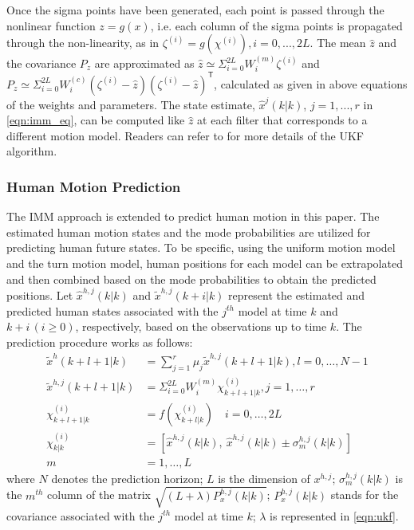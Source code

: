 \documentclass[letterpaper, 10 pt, conference]{ieeeconf}
\newcommand{\todoQ}[1]{\vspace{0px} %
	\todo[inline, color=orange!50]{\textbf{[Note:]} {#1}} %
}
\begin{document}
	Once the sigma points have been generated, each point is passed through the nonlinear function $z=g(x)$, i.e. each column of the sigma points is propagated through the non-linearity, as in $\zeta^{(i)}=g(\chi^{(i)}), i=0,...,2L$. The mean $\hat{z}$ and the covariance $P_z$ are approximated as $\hat{z}\simeq \Sigma_{i=0}^{2L}W_i^{(m)} \zeta^{(i)}$ and $P_z \simeq  \Sigma_{i=0}^{2L}W_i^{(c)}(\zeta^{(i)}-\hat{z})(\zeta^{(i)}-\hat{z})^\mathsf{T}$, calculated as given in above equations of the weights and parameters\cite{hong2013vehicle}. The state estimate, $\hat{x}^j(k|k)$, $j=1,...,r$ in \cref{eqn:imm_eq}, can be computed like $\hat{z}$ at each filter that corresponds to a different motion model. 
	Readers can refer to \cite {haykin2004kalman} for more details of the UKF algorithm.
	
	\subsubsection{Human Motion Prediction}\label{subsec:motion_pred}
	The IMM approach is extended to predict human motion in this paper. The estimated human motion states and the mode probabilities are utilized for predicting human future states.
	To be specific, using the uniform motion model and the turn motion model, human positions for each model can be extrapolated and then combined based on the mode probabilities to obtain the predicted positions.
	Let $\hat{x}^{h,j}(k|k)$ and $\tilde{x}^{h,j}(k+i|k)$ represent the estimated and predicted human states associated with the $j^{th}$ model at time $k$ and $k+i\,(i\ge 0)$, respectively, based on the observations up to time $k$.
	The prediction procedure works as follows:
	\small	\begin{subequations}\label{eqn:motion_pred_imm}
		\begin{align}
			\tilde{x}^h(k+l+1|k)&=\sum\limits_{j=1}^{r}\mu_j \tilde{x}^{h,j}(k+l+1|k), l=0,\dots,N-1 \\
			\tilde{x}^{h,j}(k+l+1|k)&=\Sigma_{i=0}^{2L}W_i^{(m)} \chi_{k+l+1|k}^{(i)}, j=1,\dots,r\\
			\chi_{k+l+1|k}^{(i)}&=f(\chi_{k+l|k}^{(i)}) \quad i=0,\dots, 2L\\
			\chi_{k|k}^{(i)}&=\left[\hat{x}^{h,j}(k|k),\ \hat{x}^{h,j}(k|k) \pm \sigma_{m}^{h,j}(k|k) \right]\\
			m&=1,\dots,L \nonumber 
		\end{align}
	\end{subequations} \normalsize
	where $N$ denotes the prediction horizon; $L$ is the dimension of $x^{h,j}$; $\sigma^{h,j}_m(k|k)$ is the $m^{th}$ column of the matrix $\sqrt{(L+\lambda)P_x^{h,j}(k|k)}$; $P_x^{h,j}(k|k)$ stands for the covariance associated with the $j^{th}$ model at time $k$; $\lambda$ is represented in \cref{eqn:ukf}.
	
\end{document}
